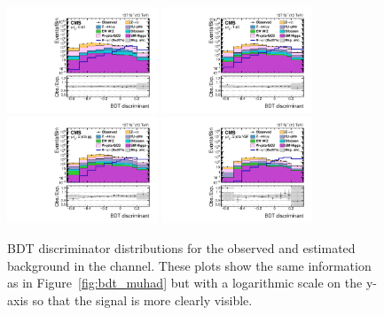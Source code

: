 \begin{figure}[htbp!]
  \centering
  \includegraphics[width=0.4\textwidth]{plots/chapter9/BDT/mutau/log_0jet.pdf}
  \includegraphics[width=0.4\textwidth]{plots/chapter9/BDT/mutau/log_1jet.pdf} \\
  \includegraphics[width=0.4\textwidth]{plots/chapter9/BDT/mutau/log_2jet_gg.pdf}
  \includegraphics[width=0.4\textwidth]{plots/chapter9/BDT/mutau/log_2jet_vbf.pdf} \\
  \caption{BDT discriminator distributions for the observed and estimated background in the \muhad channel. These plots show the same information as in Figure~\ref{fig:bdt_muhad} but with a logarithmic scale on the y-axis so that the signal is more clearly visible.}
  \label{fig:bdt_muhad_log}
\end{figure}

